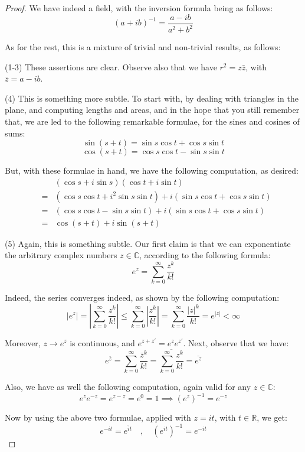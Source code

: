 \documentclass[12pt]{amsbook}
\begin{document}
\begin{proof}
We have indeed a field, with the inversion formula being as follows:
$$(a+ib)^{-1}=\frac{a-ib}{a^2+b^2}$$

As for the rest, this is a mixture of trivial and non-trivial results, as follows:

\medskip

(1-3) These assertions are clear. Observe also that we have $r^2=z\bar{z}$, with $\bar{z}=a-ib$.

\medskip

(4) This is something more subtle. To start with, by dealing with triangles in the plane, and computing lengths and areas, and in the hope that you still remember that, we are led to the following remarkable formulae, for the sines and cosines of sums:
$$\sin(s+t)=\sin s\cos t+\cos s\sin t$$
$$\cos(s+t)=\cos s\cos t-\sin s\sin t$$

But, with these formulae in hand, we have the following computation, as desired:
\begin{eqnarray*}
&&(\cos s+i\sin s)(\cos t+i\sin t)\\
&=&(\cos s\cos t+i^2\sin s\sin t)+i(\sin s\cos t+\cos s\sin t)\\
&=&(\cos s\cos t-\sin s\sin t)+i(\sin s\cos t+\cos s\sin t)\\
&=&\cos(s+t)+i\sin(s+t)
\end{eqnarray*}

(5) Again, this is something subtle. Our first claim is that we can exponentiate the arbitrary complex numbers $z\in\mathbb C$, according to the following formula:
$$e^z=\sum_{k=0}^\infty\frac{z^k}{k!}$$

Indeed, the series converges indeed, as shown by the following computation:
$$|e^z|
=\left|\sum_{k=0}^\infty\frac{z^k}{k!}\right|
\leq\sum_{k=0}^\infty\left|\frac{z^k}{k!}\right|
=\sum_{k=0}^\infty\frac{|z|^k}{k!}
=e^{|z|}<\infty$$

Moreover, $z\to e^z$ is continuous, and $e^{z+z'}=e^ze^{z'}$. Next, observe that we have:
$$e^{\bar{z}}=\sum_{k=0}^\infty\frac{\bar{z}^k}{k!}=\overline{\sum_{k=0}^\infty\frac{z^k}{k!}}=\overline{e^z}$$

Also, we have as well the following computation, again valid for any $z\in\mathbb C$:
$$e^ze^{-z}=e^{z-z}=e^0=1\implies (e^z)^{-1}=e^{-z}$$

Now by using the above two formulae, applied with $z=it$, with $t\in\mathbb R$, we get:
$$e^{-it}=\overline{e^{it}}\quad,\quad (e^{it})^{-1}=e^{-it}$$


\end{proof}
\end{document}
